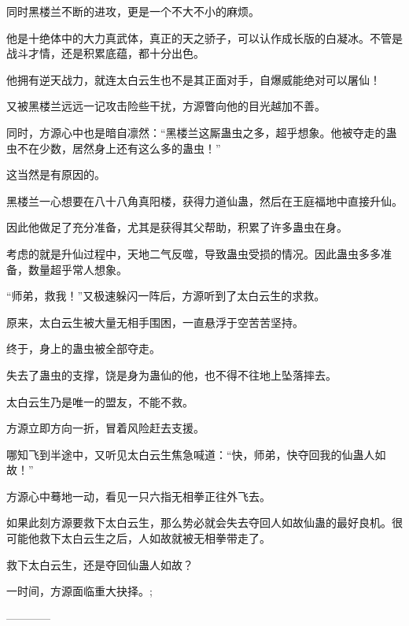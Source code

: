 \begin{this_body}
同时黑楼兰不断的进攻，更是一个不大不小的麻烦。

他是十绝体中的大力真武体，真正的天之骄子，可以认作成长版的白凝冰。不管是战斗才情，还是积累底蕴，都十分出色。

他拥有逆天战力，就连太白云生也不是其正面对手，自爆威能绝对可以屠仙！

又被黑楼兰远远一记攻击险些干扰，方源瞥向他的目光越加不善。

同时，方源心中也是暗自凛然：“黑楼兰这厮蛊虫之多，超乎想象。他被夺走的蛊虫不在少数，居然身上还有这么多的蛊虫！”

这当然是有原因的。

黑楼兰一心想要在八十八角真阳楼，获得力道仙蛊，然后在王庭福地中直接升仙。

因此他做足了充分准备，尤其是获得其父帮助，积累了许多蛊虫在身。

考虑的就是升仙过程中，天地二气反噬，导致蛊虫受损的情况。因此蛊虫多多准备，数量超乎常人想象。

“师弟，救我！”又极速躲闪一阵后，方源听到了太白云生的求救。

原来，太白云生被大量无相手围困，一直悬浮于空苦苦坚持。

终于，身上的蛊虫被全部夺走。

失去了蛊虫的支撑，饶是身为蛊仙的他，也不得不往地上坠落摔去。

太白云生乃是唯一的盟友，不能不救。

方源立即方向一折，冒着风险赶去支援。

哪知飞到半途中，又听见太白云生焦急喊道：“快，师弟，快夺回我的仙蛊人如故！”

方源心中蓦地一动，看见一只六指无相拳正往外飞去。

如果此刻方源要救下太白云生，那么势必就会失去夺回人如故仙蛊的最好良机。很可能他救下太白云生之后，人如故就被无相拳带走了。

救下太白云生，还是夺回仙蛊人如故？

一时间，方源面临重大抉择。;

------------

\end{this_body}

